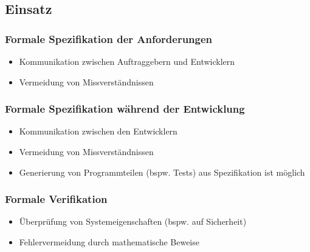 \documentclass[a4paper, 11pt, accentcolor = tud3b]{tudreport}
\begin{document}
		    \subsection{Einsatz}
			    \subsubsection{Formale Spezifikation der Anforderungen}
				    \begin{itemize}
				    	\item Kommunikation zwischen Auftraggebern und Entwicklern
				    	\item Vermeidung von Missverständnissen
				    \end{itemize}
			    
			    \subsubsection{Formale Spezifikation während der Entwicklung}
				    \begin{itemize}
				    	\item Kommunikation zwischen den Entwicklern
				    	\item Vermeidung von Missverständnissen
				    	\item Generierung von Programmteilen (bspw. Tests) aus Spezifikation ist möglich
				    \end{itemize}
			    
			    \subsubsection{Formale Verifikation}
				    \begin{itemize}
				    	\item Überprüfung von Systemeigenschaften (bspw. auf Sicherheit)
				    	\item Fehlervermeidung durch mathematische Beweise
				    \end{itemize}
	    
\end{document}
